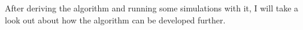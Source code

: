 \documentclass[Thesis.tex]{subfiles}
\begin{document}
After deriving the algorithm and running some simulations with it, I will take a look out about how the algorithm can be developed further.
%
%
%
%
%
%
%


\glsresetall
\end{document}
